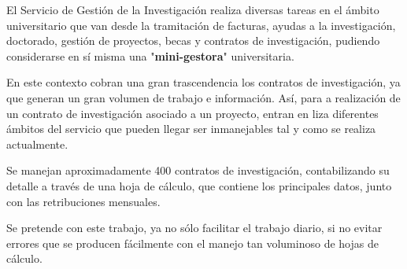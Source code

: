 
El Servicio de Gestión de la Investigación realiza diversas tareas en el ámbito universitario que van desde la tramitación de facturas, ayudas a la investigación, doctorado, gestión de proyectos, becas y contratos de investigación, pudiendo considerarse en sí misma una "\textbf{mini-gestora}" universitaria.

En este contexto cobran una gran trascendencia los contratos de investigación, ya que generan un gran volumen de trabajo e información. Así, para a realización de un contrato de investigación asociado a un proyecto, entran en liza diferentes ámbitos del servicio que pueden llegar ser inmanejables tal y como se realiza actualmente.

Se manejan aproximadamente 400 contratos de investigación, contabilizando su detalle a través de una hoja de cálculo, que contiene los principales datos, junto con las retribuciones mensuales.

Se pretende con este trabajo, ya no sólo facilitar el trabajo diario, si no evitar errores que se producen fácilmente con el manejo tan voluminoso de hojas de cálculo.